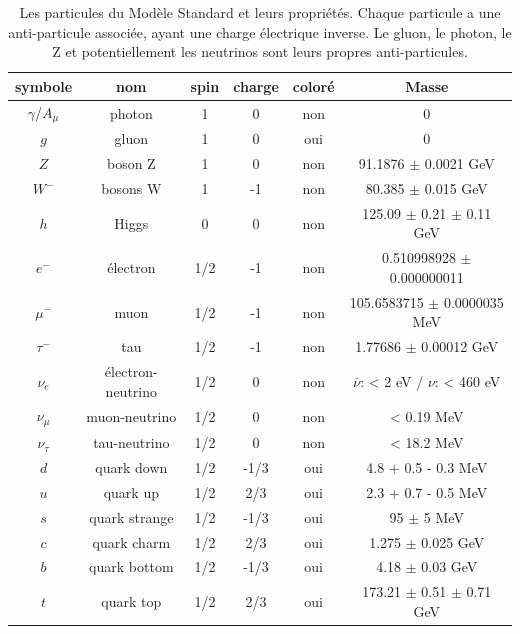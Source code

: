 \begin{table}[h!]
  \centering
  \begin{tabular}{|c|c|c|c|c|c|}
  \hline
  symbole   & nom                 & spin & charge & coloré & Masse \\ \hline
  $\gamma$/$A_\mu$  & photon              & 1    & 0     & non    & 0    \\ \hline
  $g$       & gluon               & 1    & 0     & oui    &  0   \\ \hline
  $Z$       & boson Z             & 1    & 0     & non    & 91.1876 $\pm$ 0.0021 GeV \cite{olive_review_2014} \\ \hline
  $W^-$     & bosons W            & 1    & -1    & non    & 80.385 $\pm$ 0.015 GeV \cite{olive_review_2014} \\ \hline
  $h$       & Higgs               & 0    & 0     & non    & 125.09 $\pm$ 0.21 $\pm$ 0.11 GeV \cite{atlas_collaboration_combined_2015}  \\ \hline
  $e^-$     & électron          & 1/2  & -1    & non    & 0.510998928 $\pm$ 0.000000011 \cite{mohr_codata_2012} \\ \hline
  $\mu^-$   & muon                & 1/2  & -1    & non    & 105.6583715 $\pm$ 0.0000035 MeV \cite{mohr_codata_2012}    \\ \hline
  $\tau^-$  & tau                 & 1/2  & -1    & non    & 1.77686 $\pm$ 0.00012 GeV \cite{olive_review_2014}    \\ \hline
  $\nu_e$   & électron-neutrino & 1/2  & 0     & non    & $\bar{\nu}$: < 2 eV \cite{olive_review_2014} / $\nu$: < 460 eV \cite{yasumi_mass_1994} \\ \hline
  $\nu_\mu$ & muon-neutrino       & 1/2  & 0     & non    & < 0.19 MeV \cite{olive_review_2014}    \\ \hline
  $\nu_\tau$ & tau-neutrino       & 1/2  & 0     & non    &  < 18.2 MeV \cite{al_upper_1998}   \\ \hline
  $d$       & quark down          & 1/2  & -1/3  & oui    & 4.8 + 0.5 - 0.3 MeV \cite{olive_review_2014}     \\ \hline
  $u$       & quark up            & 1/2  & 2/3   & oui    & 2.3 + 0.7 - 0.5 MeV \cite{olive_review_2014}    \\ \hline
  $s$       & quark strange       & 1/2  & -1/3  & oui    & 95 $\pm$ 5 MeV \cite{olive_review_2014}    \\ \hline
  $c$       & quark charm         & 1/2  & 2/3   & oui    & 1.275 $\pm$ 0.025 GeV \cite{olive_review_2014}    \\ \hline
  $b$       & quark bottom        & 1/2  & -1/3  & oui    & 4.18 $\pm$ 0.03 GeV \cite{olive_review_2014}    \\ \hline
  $t$       & quark top           & 1/2  & 2/3   & oui    & 173.21 $\pm$ 0.51 $\pm$ 0.71 GeV \cite{olive_review_2014}    \\ \hline
\end{tabular}
\caption{Les particules du Modèle Standard et leurs propriétés. Chaque particule a une anti-particule associée,
  ayant une charge électrique inverse. Le gluon, le photon, le Z et potentiellement les neutrinos sont leurs
  propres anti-particules. }
\label{tab:ms_particules}
\end{table}


